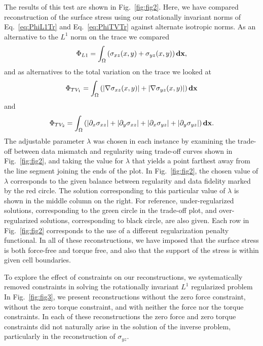 \documentclass[aps,prl,reprint,twocolumn,groupedaddress,showpacs]{revtex4-1}
\def\d{{\bf d}}
\def\x{{\bf x}}
\begin{document}
The results of this test are shown in Fig.~\ref{fig:fig2}. Here, we have compared reconstruction of the surface stress using our rotationally invariant norms of Eq.~\ref{eq:PhiL1Tr} and Eq.~\ref{eq:PhiTVTr} against alternate isotropic norms. As an alternative to the $L^1$ norm on the trace we compared
\begin{equation}
\Phi_{L1} = \int_\Omega \left( \sigma_{xz}(x,y) +\sigma_{yz}(x,y) \right)\d\x,
\end{equation} 
and as alternatives to the total variation on the trace we looked at
 \begin{equation}
 \Phi_{TV_1} = \int_\Omega \left( \vert\nabla\sigma_{xz}(x,y) \vert + \vert\nabla\sigma_{yz}(x,y) \vert\right)\d\x
 \label{eq:PhiTV1}
\end{equation}
and
\begin{equation}
\Phi_{TV_2} = \int_\Omega  \left( \vert\partial_x\sigma_{xz}\vert + \vert\partial_y\sigma_{xz}\vert + \vert\partial_x\sigma_{yz}\vert+ \vert\partial_y\sigma_{yz}\vert\right)\d\x.
 \label{eq:PhiTV2}
\end{equation}
 The adjustable parameter $\lambda$ was chosen in each instance by examining the trade-off between data mismatch and regularity using trade-off curves shown in Fig.~\ref{fig:fig2}, and taking the value for $\lambda$ that yields a point farthest away from the line  segment joining the ends of the plot. In Fig.~\ref{fig:fig2}, the chosen value of $\lambda$ corresponds to the given balance between regularity and data fidelity marked by the red circle. The solution corresponding to this particular value of $\lambda$ is shown in the middle column on the right. For reference, under-regularized solutions, corresponding to the green  circle in the trade-off plot, and over-regularized solutions, corresponding to black circle, are also given. Each row in Fig.~\ref{fig:fig2} corresponds to the use of a different regularization penalty functional. In all of these reconstructions, we have imposed that the surface stress is both force-free and torque free, and also that the support of the stress is within given cell boundaries.

To explore the effect of constraints on our reconstructions, we systematically removed constraints in solving the rotationally invariant $L^1$ regularized problem In Fig.~\ref{fig:fig3}, we present reconstructions without the zero force constraint, without the zero torque constraint, and with neither the force nor the torque constraints. In each of these reconstructions the zero force and zero torque constraints did not naturally arise in the solution of the inverse problem, particularly in the reconstruction of $\sigma_{yz}$.
\end{document}
